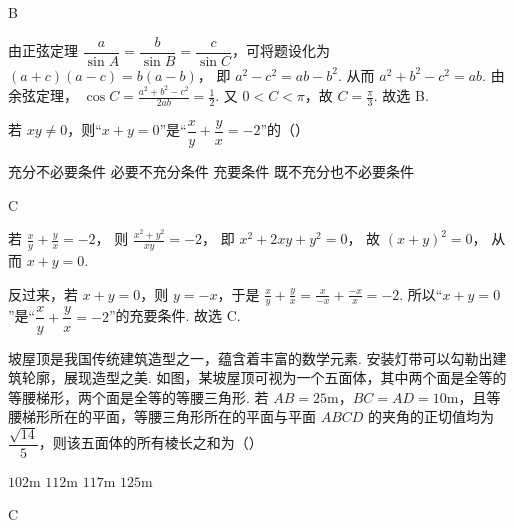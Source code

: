 \begin{answer}
B
\end{answer}

\begin{solution}
由正弦定理 \(\dfrac{a}{\sin A}=\dfrac{b}{\sin B}=\dfrac{c}{\sin C}\)，可将题设化为
\((a+c)(a-c)=b(a-b)\)，
即
\(a^2-c^2=ab-b^2\).
从而
\(a^2+b^2-c^2=ab\).
由余弦定理，
\(\cos C=\frac{a^2+b^2-c^2}{2ab}=\frac{1}{2}\).
又 \(0<C<\pi\)，故
\(C=\frac{\pi}{3}\).
故选 B.
\end{solution}

\begin{problem}
若 \(xy\ne 0\)，则“\(x+y=0\)”是“\(\dfrac{x}{y}+\dfrac{y}{x}=-2\)”的（\quad）

\choices
    {充分不必要条件}
    {必要不充分条件}
    {充要条件}
    {既不充分也不必要条件}
\end{problem}

\begin{answer}
C
\end{answer}

\begin{solution}
若
\(\frac{x}{y}+\frac{y}{x}=-2\)，
则
\(\frac{x^2+y^2}{xy}=-2\)，
即
\(x^2+2xy+y^2=0\)，
故
\((x+y)^2=0\)，
从而 \(x+y=0\).

反过来，若 \(x+y=0\)，则 \(y=-x\)，于是
\(\frac{x}{y}+\frac{y}{x}=\frac{x}{-x}+\frac{-x}{x}=-2\).
所以“\(x+y=0\)”是“\(\dfrac{x}{y}+\dfrac{y}{x}=-2\)”的充要条件.
故选 C.
\end{solution}

\begin{problem}
坡屋顶是我国传统建筑造型之一，蕴含着丰富的数学元素. 安装灯带可以勾勒出建筑轮廓，展现造型之美. 如图，某坡屋顶可视为一个五面体，其中两个面是全等的等腰梯形，两个面是全等的等腰三角形. 若 \(AB=25\text{m}\)，\(BC=AD=10\text{m}\)，且等腰梯形所在的平面，等腰三角形所在的平面与平面 \(ABCD\) 的夹角的正切值均为 \(\dfrac{\sqrt{14}}{5}\)，则该五面体的所有棱长之和为（\quad）


\choices
    {\(102\text{m}\)}
    {\(112\text{m}\)}
    {\(117\text{m}\)}
    {\(125\text{m}\)}
\end{problem}

\begin{answer}
C
\end{answer}

